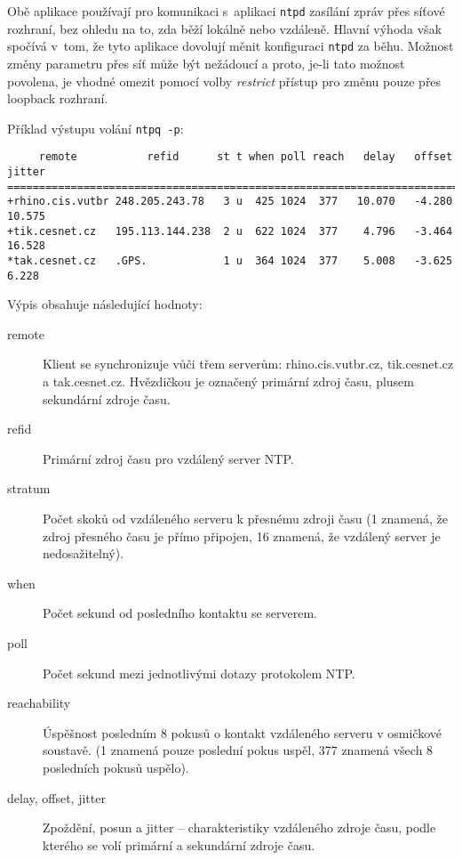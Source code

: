 Obě aplikace používají pro komunikaci s~aplikaci {\tt ntpd} zasílání zpráv přes síťové rozhraní, bez ohledu na to, zda běží lokálně nebo vzdáleně. Hlavní výhoda však spočívá v~tom, že tyto aplikace dovolují měnit konfiguraci {\tt ntpd} za běhu. Možnost změny parametru přes síť může být nežádoucí a proto, je-li tato možnost povolena, je vhodné omezit pomocí volby {\em restrict} přístup pro změnu pouze přes loopback rozhraní.

Příklad výstupu volání {\tt ntpq -p}:

\begin{verbatim}
     remote           refid      st t when poll reach   delay   offset  jitter
==============================================================================
+rhino.cis.vutbr 248.205.243.78   3 u  425 1024  377   10.070   -4.280  10.575
+tik.cesnet.cz   195.113.144.238  2 u  622 1024  377    4.796   -3.464  16.528
*tak.cesnet.cz   .GPS.            1 u  364 1024  377    5.008   -3.625   6.228
\end{verbatim}

Výpis obsahuje následující hodnoty:

\begin{description}

  \item[remote] Klient se synchronizuje vůči třem serverům: rhino.cis.vutbr.cz,
    tik.cesnet.cz a tak.cesnet.cz. Hvězdičkou je označený primární zdroj času,
    plusem sekundární zdroje času.

  \item[refid] Primární zdroj času pro vzdálený server NTP.

  \item[stratum] Počet skoků od vzdáleného serveru k přesnému zdroji času (1
    znamená, že zdroj přesného času je přímo připojen, 16 znamená, že vzdálený
    server je nedosažitelný).

  \item[when] Počet sekund od posledního kontaktu se serverem.

  \item[poll] Počet sekund mezi jednotlivými dotazy protokolem NTP.

  \item[reachability] Úspěšnost posledním 8 pokusů o kontakt vzdáleného serveru
    v osmičkové soustavě. (1 znamená pouze poslední pokus uspěl, 377 znamená
    všech 8 posledních pokusů uspělo).

  \item[delay, offset, jitter] Zpoždění, posun a jitter -- charakteristiky
    vzdáleného zdroje času, podle kterého se volí primární a sekundární zdroje
    času.

\end{description}

